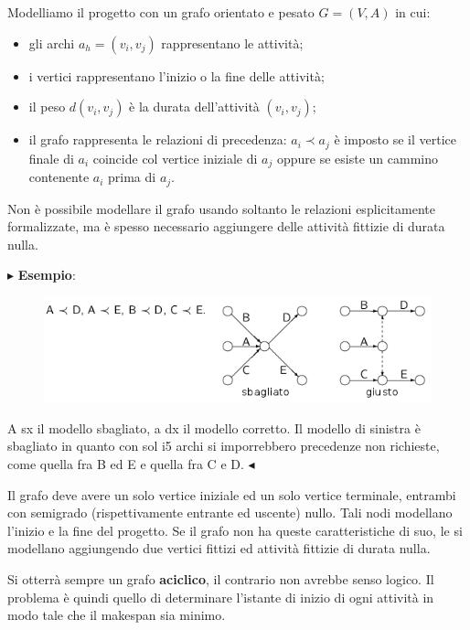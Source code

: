 \documentclass[11pt]{book}
\begin{document}
Modelliamo il progetto con un grafo orientato e pesato $G = (V,A)$ in
cui:

\begin{itemize}
\item gli archi $a_h = (v_i,v_j)$ rappresentano le attivit\`a;
\item i vertici rappresentano l'inizio o la fine delle attivit\`a;
\item il peso $d(v_i,v_j)$ \`e la durata dell'attivit\`a $(v_i,v_j)$;
\item il grafo rappresenta le relazioni di precedenza: $a_i \prec a_j$
  \`e imposto se il vertice finale di $a_i$ coincide col vertice
  iniziale di $a_j$ oppure se esiste un cammino contenente $a_i$ prima
  di $a_j$.
\end{itemize}

Non \`e possibile modellare il grafo usando soltanto le relazioni
esplicitamente formalizzate, ma \`e spesso necessario aggiungere delle
attivit\`a fittizie di durata nulla.

\vspace{11pt}
$\blacktriangleright$ {\bf Esempio}:

\begin{figure}[H]
  \centering
  \includegraphics[width=\textwidth]{images/cap7fig713.png}
  \label{cap7figura713.png}
\end{figure}

A sx il modello sbagliato, a dx il modello corretto. Il modello di
sinistra \`e sbagliato in quanto con sol i5 archi si imporrebbero
precedenze non richieste, come quella fra B ed E e quella fra C e
D. $\blacktriangleleft$
\vspace{11pt}

Il grafo deve avere un solo vertice iniziale ed un solo vertice
terminale, entrambi con semigrado (rispettivamente entrante ed
uscente) nullo. Tali nodi modellano l'inizio e la fine del
progetto. Se il grafo non ha queste caratteristiche di suo, le si
modellano aggiungendo due vertici fittizi ed attivit\`a fittizie di
durata nulla.

Si otterr\`a sempre un grafo {\bf aciclico}, il contrario non avrebbe
senso logico. Il problema \`e quindi quello di determinare l'istante
di inizio di ogni attivit\`a in modo tale che il makespan sia minimo.
\end{document}
